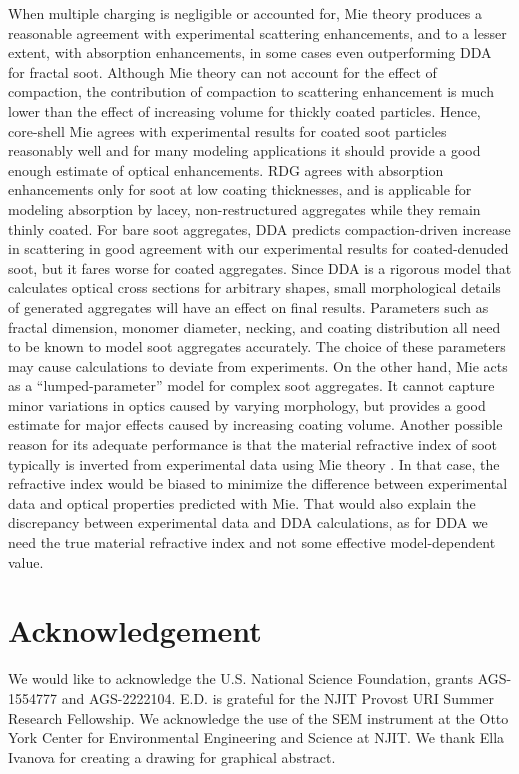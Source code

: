 \documentclass[12pt,authoryear]{elsarticle}
\begin{document}
When multiple charging is negligible or accounted for, Mie theory produces a reasonable agreement with experimental scattering enhancements, and to a lesser extent, with absorption enhancements, in some cases even outperforming DDA for fractal soot. Although Mie theory can not account for the effect of compaction, the contribution of compaction to scattering enhancement is much lower than the effect of increasing volume for thickly coated particles. Hence, core-shell Mie agrees with experimental results for coated soot particles reasonably well and for many modeling applications it should provide a good enough estimate of optical enhancements. RDG agrees with absorption enhancements only for soot at low coating thicknesses, and is applicable for modeling absorption by lacey, non-restructured aggregates while they remain thinly coated. For bare soot aggregates, DDA predicts compaction-driven increase in scattering in good agreement with our experimental results for coated-denuded soot, but it fares worse for coated aggregates. Since DDA is a rigorous model that calculates optical cross sections for arbitrary shapes, small morphological details of generated aggregates will have an effect on final results. Parameters such as fractal dimension, monomer diameter, necking, and coating distribution all need to be known to model soot aggregates accurately. The choice of these parameters may cause calculations to deviate from experiments. On the other hand, Mie acts as a ``lumped-parameter'' model for complex soot aggregates. It cannot capture minor variations in optics caused by varying morphology, but provides a good estimate for major effects caused by increasing coating volume. Another possible reason for its adequate performance is that the material refractive index of soot typically is inverted from experimental data using Mie theory \citep{RN23}. In that case, the refractive index would be biased to minimize the difference between experimental data and optical properties predicted with Mie. That would also explain the discrepancy between experimental data and DDA calculations, as for DDA we need the true material refractive index and not some effective model-dependent value. 



\section*{Acknowledgement}
We would like to acknowledge the U.S. National Science Foundation, grants AGS-1554777 and AGS-2222104. E.D. is grateful for the NJIT Provost
URI Summer Research Fellowship. We acknowledge the use of the SEM instrument at the Otto York Center for Environmental Engineering and Science at NJIT. We thank Ella Ivanova for creating a drawing for graphical abstract.
\end{document}
